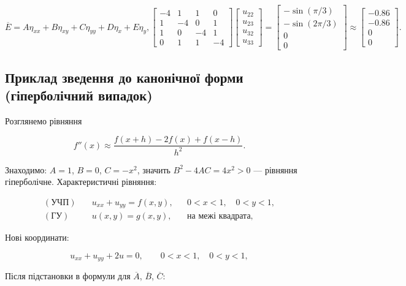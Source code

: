 \documentclass[
  ukrainian,
]{article}
\begin{document}
\[\overline{E} = A\eta_{xx} + B\eta_{xy} + C\eta_{yy} + D\eta_x + E\eta_y,
\begin{bmatrix}-4 & 1 & 1 & 0 \\1 & -4 & 0 & 1 \\1 & 0 & -4 & 1 \\0 & 1 & 1 & -4\end{bmatrix}\begin{bmatrix}u_{22}\\u_{23}\\u_{32}\\u_{33}\end{bmatrix}=\begin{bmatrix}-\sin(\pi/3)\\-\sin(2\pi/3)\\0\\0\end{bmatrix}\approx\begin{bmatrix}-0.86\\-0.86\\0\\0\end{bmatrix}.
\]

\subsection{Приклад зведення до канонічної форми (гіперболічний
випадок)}\label{ux43fux440ux438ux43aux43bux430ux434-ux437ux432ux435ux434ux435ux43dux43dux44f-ux434ux43e-ux43aux430ux43dux43eux43dux456ux447ux43dux43eux457-ux444ux43eux440ux43cux438-ux433ux456ux43fux435ux440ux431ux43eux43bux456ux447ux43dux438ux439-ux432ux438ux43fux430ux434ux43eux43a}

Розглянемо рівняння

\[
f''(x)\approx \frac{f(x+h)-2f(x)+f(x-h)}{h^2}.
\]

Знаходимо: \(A = 1\), \(B = 0\), \(C = -x^2\), значить
\(B^2 - 4AC = 4x^2 > 0\) --- рівняння гіперболічне. Характеристичні
рівняння:

\[
\begin{aligned}(\text{УЧП})\quad & u_{xx}+u_{yy}=f(x,y), && 0<x<1,\quad 0<y<1,\\(\text{ГУ})\quad & u(x,y)=g(x,y), && \text{на межі квадрата},\end{aligned}
\]

Нові координати:

\[
u_{xx}+u_{yy}+2u=0,\qquad 0<x<1,\quad 0<y<1,
\]

Після підстановки в формули для \(\overline{A}\), \(\overline{B}\),
\(\overline{C}\):
\end{document}
